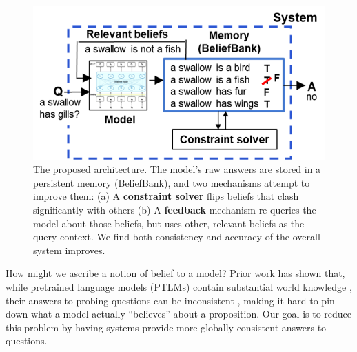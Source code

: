 \documentclass[11pt]{article}
\newcommand{\nk}[1]{\textcolor{green}{Nora: #1}}
\begin{document}
\begin{figure}[t]
\centering
     \includegraphics[width=1\columnwidth]{architecture3.png}	   %
\caption{ 
The proposed architecture. The model's raw answers are stored in a
persistent memory (BeliefBank), and two mechanisms attempt to improve them:
(a) A {\bf constraint solver} flips beliefs that clash significantly with others
(b) A {\bf feedback} mechanism re-queries the model about those beliefs, but
uses other, relevant beliefs as the query context. We find both consistency and accuracy
of the overall system improves. \label{architecture}}
 \vspace{-5mm}
\end{figure}

How might we ascribe a notion of belief to a model? Prior work has shown that, while
pretrained language models (PTLMs) contain substantial world knowledge \cite{Petroni2019LanguageMA, roberts-etal-2020-much},
their answers to probing questions can be inconsistent \cite{Elazar2021MeasuringAI, ravichander-etal-2020-systematicity, Kassner2020NegatedAM},
making it hard to pin down what a model actually ``believes'' about a proposition.
Our goal is to reduce this problem by having systems provide more globally consistent
answers to questions.
\end{document}
